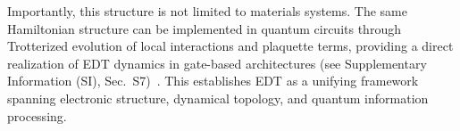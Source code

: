 \documentclass[twocolumn,10pt]{article}
\begin{document}
Importantly, this structure is not limited to materials systems. The same Hamiltonian structure can be implemented in quantum circuits through Trotterized evolution of local interactions and plaquette terms, providing a direct realization of EDT dynamics in gate-based architectures (see Supplementary Information (SI), Sec.~S7)~\cite{Lloyd1996,Childs2019}. This establishes EDT as a unifying framework spanning electronic structure, dynamical topology, and quantum information processing.



\end{document}
